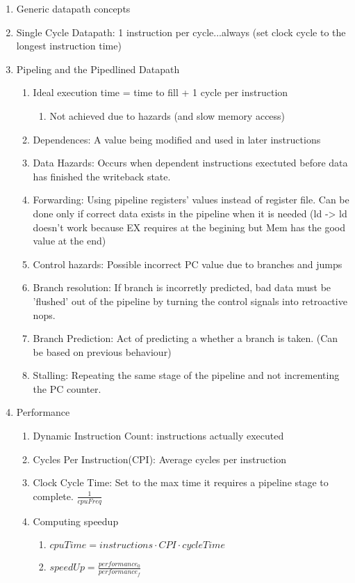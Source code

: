 \documentclass[12pt]{article}
\renewcommand{\=}[1]{\stackrel{#1}{=}} %
\theoremstyle{definition}
\theoremstyle{remark}
\begin{document}
  \begin{enumerate}
  \item Generic datapath concepts
  \item Single Cycle Datapath: 1 instruction per cycle...always (set
    clock cycle to the longest instruction time)
  \item Pipeling and the Pipedlined Datapath
    \begin{enumerate}
    \item Ideal execution time = time to fill + 1 cycle per instruction
      \begin{enumerate}
      \item Not achieved due to hazards (and slow memory access)
      \end{enumerate}

    \item Dependences: A value being modified and used in later instructions
    \item Data Hazards: Occurs when dependent instructions exectuted
      before data has finished the writeback state.
    \item Forwarding: Using pipeline registers' values instead of
      register file. Can be done only if correct data exists in the
      pipeline when it is needed (ld -> ld doesn't work because EX
      requires at the begining but Mem has the good value at the end)
    \item Control hazards: Possible incorrect PC value due to branches
      and jumps
    \item Branch resolution: If branch is incorretly predicted, bad
      data must be 'flushed' out of the pipeline by turning the
      control signals into retroactive nops.
    \item Branch Prediction: Act of predicting a whether a branch is
      taken. (Can be based on previous behaviour)
    \item Stalling: Repeating the same stage of the pipeline and not
      incrementing the PC counter.
    \end{enumerate}
  \item Performance
    \begin{enumerate}
    \item Dynamic Instruction Count: instructions actually executed
    \item Cycles Per Instruction(CPI): Average cycles per instruction
    \item Clock Cycle Time: Set to the max time it requires a pipeline
      stage to complete. $\frac{1}{cpuFreq}$
    \item Computing speedup
      \begin{enumerate}
      \item $cpuTime = instructions\cdot CPI \cdot cycleTime$
      \item $speedUp = \frac{performance_0}{performance_f}$
      \end{enumerate}


\end{enumerate}
\end{enumerate}
\end{document}
